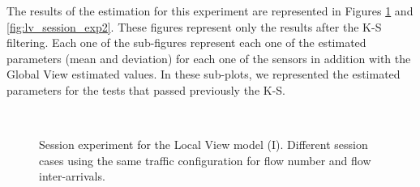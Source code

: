 The results of the estimation for this experiment are represented in Figures \ref{fig:lv_session_exp1} and \ref{fig:lv_session_exp2}. These figures represent only the results after the \acs{K-S} filtering. Each one of the sub-figures represent each one of the estimated parameters (mean and deviation) for each one of the sensors in addition with the Global View estimated values. In these sub-plots, we represented the estimated parameters for the tests that passed previously the \acs{K-S}.

\begin{figure}[h!]
	\centering
	\\
	\caption{Session experiment for the Local View model (I). Different session cases using the same traffic configuration for flow number and flow inter-arrivals.}
	\label{fig:lv_session_exp1}
\end{figure}

